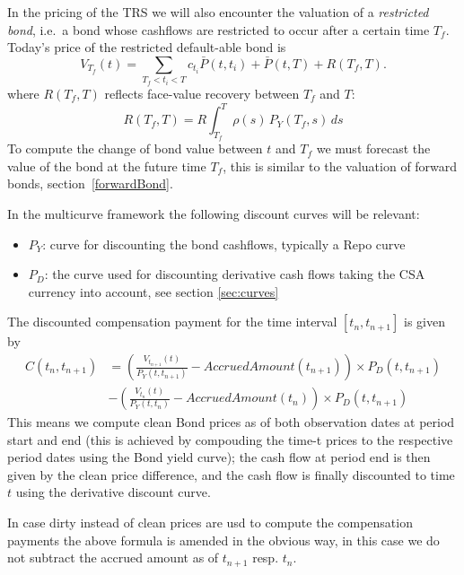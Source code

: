 %
\medskip
In the pricing of the TRS we will also encounter the valuation of a
\emph{restricted bond}, i.e.~a bond whose cashflows are restricted to
occur after a certain time $T_f$.
Today's price of the restricted default-able bond is
$$
V_{T_f}(t)=\sum_{T_f<t_i<T} c_{t_i}
\bar P(t,t_i)+\bar P(t,T)+R(T_f,T).
$$
where $R(T_f,T)$ reflects face-value recovery between $T_f$ and
$T$: 
$$
R(T_f,T)=R\int_{T_f}^T\rho(s)\,P_{Y}(T_f,s)\,ds
$$
%
To compute the change of bond value between $t$ and $T_f$ we must
forecast the value of the bond at the future time $T_f$,  
this is similar to the valuation of forward bonds,
section~\ref{forwardBond}.

In the multicurve framework the following discount curves will be relevant:
\begin{itemize}
\item  $P_{Y}$: curve for discounting the bond cashflows, typically
  a Repo curve
\item $P_{D}$: the curve used for discounting derivative cash flows
  taking the CSA currency into account, see section \ref{sec:curves}
\end{itemize}

The discounted compensation payment for the time interval $[t_n,t_{n+1}]$
is given by
\begin{align*}
  C(t_n,t_{n+1})&=\left(\frac{V_{t_{n+1}}(t)}{P_{Y}(t,t_{n+1})} -AccruedAmount(t_{n+1})\right) \times P_{D}(t,t_{n+1}) \\
                &-\left(\frac{V_{t_{n}}(t)}{P_{Y}(t,t_{n})} -AccruedAmount(t_{n})\right) \times P_{D}(t,t_{n+1})
\end{align*}
This means we compute clean Bond prices as of both observation
dates at period start and end (this is achieved by compouding the
time-t prices to the respective period dates using the Bond yield
curve);  the cash flow at period end is then given by the clean price 
difference, and the cash flow is finally discounted to time $t$ using 
the derivative discount curve.

In case dirty instead of clean prices are usd to compute the compensation payments the above formula is amended in the
obvious way, in this case we do not subtract the accrued amount as of $t_{n+1}$ resp. $t_{n}$.

